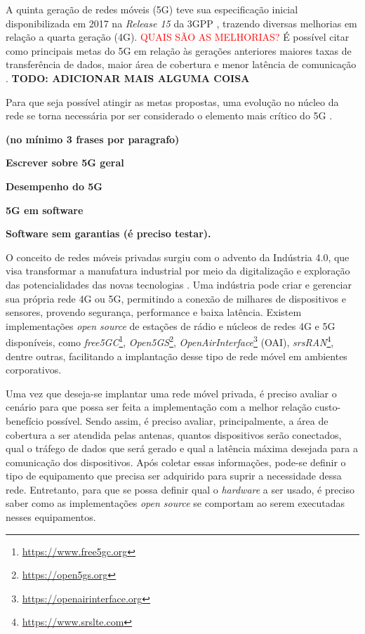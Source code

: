 A quinta geração de redes móveis (5G) teve sua especificação inicial disponibilizada em 2017 na \textit{Release 15} da 3GPP \cite{Redana2020}, trazendo diversas melhorias em relação a quarta geração (4G). \textcolor{red}{QUAIS SÃO AS MELHORIAS? }
É possível citar como principais metas do 5G em relação às gerações anteriores maiores taxas de transferência de dados, maior área de cobertura e menor latência de comunicação \cite{Ahmad2019}.
\textbf{TODO: ADICIONAR MAIS ALGUMA COISA} 

Para que seja possível atingir as metas propostas, uma evolução no núcleo da rede se torna necessária por ser considerado o elemento mais crítico do 5G \cite{Cardoso2020}. 

\textbf{(no mínimo 3 frases por paragrafo)}

\textbf{Escrever sobre 5G geral}

\textbf{Desempenho do 5G}

\textbf{5G em software}

\textbf{Software sem garantias (é preciso testar).}

O conceito de redes móveis privadas surgiu com o advento da Indústria 4.0, que visa transformar a manufatura industrial por meio da digitalização e exploração das potencialidades das novas tecnologias \cite{Rojko2017}.
Uma indústria pode criar e gerenciar sua própria rede 4G ou 5G, permitindo a conexão de milhares de dispositivos e sensores, provendo segurança, performance e baixa latência.
Existem implementações \textit{open source} de estações de rádio e núcleos de redes 4G e 5G disponíveis, como \textit{free5GC}\footnote{\url{https://www.free5gc.org}}, \textit{Open5GS}\footnote{\url{https://open5gs.org}}, \textit{OpenAirInterface}\footnote{\url{https://openairinterface.org}} (OAI), \textit{srsRAN}\footnote{\url{https://www.srslte.com}}, dentre outras, facilitando a implantação desse tipo de rede móvel em ambientes corporativos.

Uma vez que deseja-se implantar uma rede móvel privada, é preciso avaliar o cenário para que possa ser feita a implementação com a melhor relação custo-benefício possível.
Sendo assim, é preciso avaliar, principalmente, a área de cobertura a ser atendida pelas antenas, quantos dispositivos serão conectados, qual o tráfego de dados que será gerado e qual a latência máxima desejada para a comunicação dos dispositivos.
Após coletar essas informações, pode-se definir o tipo de equipamento que precisa ser adquirido para suprir a necessidade dessa rede.
Entretanto, para que se possa definir qual o \textit{hardware} a ser usado, é preciso saber como as implementações \textit{open source} se comportam ao serem executadas nesses equipamentos.

